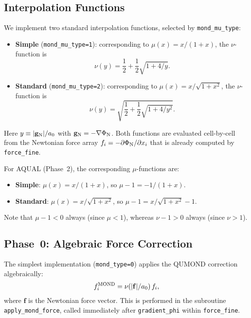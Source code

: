 \documentclass[fleqn,usenatbib]{mnras}
\newcommand{\code}[1]{\texttt{#1}}
\newcommand{\azero}{a_0}
\newcommand{\gN}{\mathbf{g}_{\rm N}}
\begin{document}
\subsection{Interpolation Functions}
\label{sec:mond_nu}

We implement two standard interpolation functions, selected by
\code{mond\_mu\_type}:
\begin{itemize}
\item \textbf{Simple} (\code{mond\_mu\_type=1}): corresponding to
  $\mu(x)=x/(1+x)$, the $\nu$-function is
  \begin{equation}
  \nu(y) = \frac{1}{2} + \frac{1}{2}\sqrt{1 + 4/y}.
  \label{eq:nu_simple}
  \end{equation}

\item \textbf{Standard} (\code{mond\_mu\_type=2}): corresponding to
  $\mu(x)=x/\sqrt{1+x^2}$, the $\nu$-function is
  \begin{equation}
  \nu(y) = \sqrt{\frac{1}{2} + \frac{1}{2}\sqrt{1 + 4/y^2}}.
  \label{eq:nu_standard}
  \end{equation}
\end{itemize}
Here $y \equiv |\gN|/\azero$ with $\gN = -\nabla\Phi_{\rm N}$.  Both
functions are evaluated cell-by-cell from the Newtonian force array
$f_i = -\partial\Phi_{\rm N}/\partial x_i$ that is already computed by
\code{force\_fine}.

For AQUAL (Phase~2), the corresponding $\mu$-functions are:
\begin{itemize}
\item \textbf{Simple}: $\mu(x) = x/(1+x)$, so $\mu - 1 = -1/(1+x)$.
\item \textbf{Standard}: $\mu(x) = x/\sqrt{1+x^2}$, so
  $\mu - 1 = x/\sqrt{1+x^2} - 1$.
\end{itemize}
Note that $\mu - 1 < 0$ always (since $\mu < 1$), whereas
$\nu - 1 > 0$ always (since $\nu > 1$).

\subsection{Phase~0: Algebraic Force Correction}
\label{sec:mond_phase0}

The simplest implementation (\code{mond\_type=0}) applies the QUMOND
correction algebraically:
\begin{equation}
f_i^{\rm MOND} = \nu(|\mathbf{f}|/\azero)\, f_i,
\label{eq:mond_algebraic}
\end{equation}
where $\mathbf{f}$ is the Newtonian force vector.  This is performed
in the subroutine \code{apply\_mond\_force}, called immediately after
\code{gradient\_phi} within \code{force\_fine}.
\end{document}
